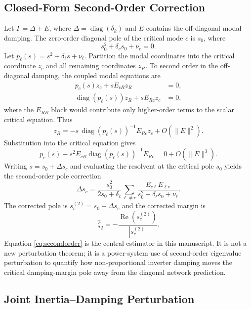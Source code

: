 \documentclass[journal]{IEEEtran}
\newcommand{\diag}{\operatorname{diag}}
\newcommand{\Real}{\operatorname{Re}}
\begin{document}
\subsection{Closed-Form Second-Order Correction}

Let $\Gamma=\Delta+E$, where $\Delta=\diag(\delta_k)$ and $E$ contains the off-diagonal modal damping. The zero-order diagonal pole of the critical mode $c$ is $s_0$, where
\begin{equation}
s_0^2+\delta_cs_0+\nu_c=0.
\end{equation}
Let $p_\ell(s)=s^2+\delta_\ell s+\nu_\ell$. Partition the modal coordinates into the critical coordinate $z_c$ and all remaining coordinates $z_R$. To second order in the off-diagonal damping, the coupled modal equations are
\begin{align}
p_c(s)z_c+sE_{cR}z_R&=0,\\
\diag(p_\ell(s))z_R+sE_{Rc}z_c&=0,
\end{align}
where the $E_{RR}$ block would contribute only higher-order terms to the scalar critical equation. Thus
\begin{equation}
z_R=-s\,\diag(p_\ell(s))^{-1}E_{Rc}z_c+O(\|E\|^2).
\end{equation}
Substitution into the critical equation gives
\begin{equation}
p_c(s)-s^2E_{cR}\diag(p_\ell(s))^{-1}E_{Rc}=0+O(\|E\|^3).
\end{equation}
Writing $s=s_0+\Delta s_c$ and evaluating the resolvent at the critical pole $s_0$ yields the second-order pole correction
\begin{equation}
\Delta s_c=
\frac{s_0^2}{2s_0+\delta_c}
\sum_{\ell\neq c}
\frac{E_{c\ell}E_{\ell c}}
{s_0^2+\delta_\ell s_0+\nu_\ell}.
\label{eq:secondorder}
\end{equation}
The corrected pole is $s_c^{(2)}=s_0+\Delta s_c$ and the corrected margin is
\begin{equation}
\widehat{\zeta}_{2}=-\frac{\Real(s_c^{(2)})}{|s_c^{(2)}|}.
\label{eq:zeta2}
\end{equation}
Equation \eqref{eq:secondorder} is the central estimator in this manuscript. It is not a new perturbation theorem; it is a power-system use of second-order eigenvalue perturbation to quantify how non-proportional inverter damping moves the critical damping-margin pole away from the diagonal network prediction.

\subsection{Joint Inertia--Damping Perturbation}
\end{document}
